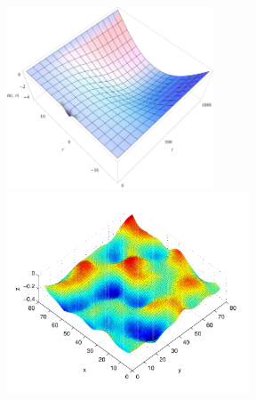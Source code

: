 \documentclass[a0,portrait]{a0poster}
\begin{document}
\begin{multicols}{2}
\begin{minipage}[b]{0.5\textwidth}
	\includegraphics[width=0.46\textwidth]{difuzija-logisticna-rast2.png}
	\includegraphics[width=0.54\textwidth]{KPZ-numericno.pdf}
\end{minipage}

\color{SaddleBrown} %


\nocite{*} %

\end{multicols}
\end{document}
